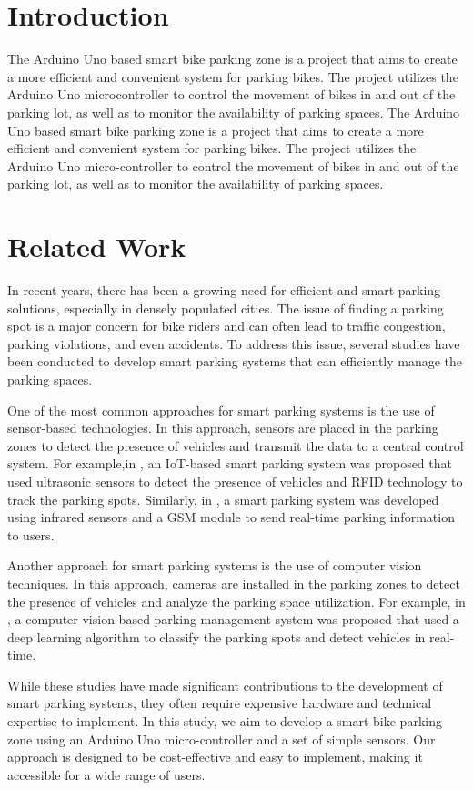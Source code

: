 \documentclass[conference]{IEEEtran}
\begin{document}
	\section{Introduction}

	The Arduino Uno based smart bike parking zone is a project that aims to create a more efficient and convenient system for parking bikes. The project utilizes the Arduino Uno microcontroller to control the movement of bikes in and out of the parking lot, as well as to monitor the availability of parking spaces. 
	The Arduino Uno based smart bike parking zone is a project that aims to create a more efficient and convenient system for parking bikes. The project utilizes the Arduino Uno micro-controller to control the movement of bikes in and out of the parking lot, as well as to monitor the availability of parking spaces. 
	\section{Related Work}
	In recent years, there has been a growing need for efficient and smart parking solutions, especially in densely populated cities. The issue of finding a parking spot is a major concern for bike riders and can often lead to traffic congestion, parking violations, and even accidents. To address this issue, several studies have been conducted to develop smart parking systems that can efficiently manage the parking spaces.
	
	One of the most common approaches for smart parking systems is the use of sensor-based technologies. In this approach, sensors are placed in the parking zones to detect the presence of vehicles and transmit the data to a central control system. For example,in \cite{b1}, an IoT-based smart parking system was proposed that used ultrasonic sensors to detect the presence of vehicles and RFID technology to track the parking spots. Similarly, in \cite{b2}, a smart parking system was developed using infrared sensors and a GSM module to send real-time parking information to users.
	
	Another approach for smart parking systems is the use of computer vision techniques. In this approach, cameras are installed in the parking zones to detect the presence of vehicles and analyze the parking space utilization. For example, in \cite{b3}, a computer vision-based parking management system was proposed that used a deep learning algorithm to classify the parking spots and detect vehicles in real-time.
	
	While these studies have made significant contributions to the development of smart parking systems, they often require expensive hardware and technical expertise to implement. In this study, we aim to develop a smart bike parking zone using an Arduino Uno micro-controller and a set of simple sensors. Our approach is designed to be cost-effective and easy to implement, making it accessible for a wide range of users.
	
\end{document}
